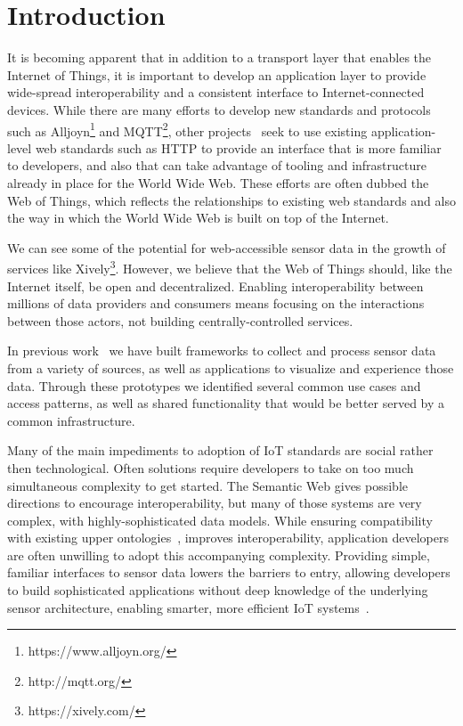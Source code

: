 \documentclass{acm_proc_article-sp}
\begin{document}
\section{Introduction}

It is becoming apparent that in addition to a transport layer that enables the
Internet of Things, it is important to develop an application layer to provide
wide-spread interoperability and a consistent interface to Internet-connected
devices. While there are many efforts to develop new standards and
protocols such as Alljoyn\footnote{https://www.alljoyn.org/} and
MQTT\footnote{http://mqtt.org/}, other projects~\cite{guinard2010} seek to
use existing application-level web standards such as HTTP to provide an
interface that is more familiar to developers, and also that can take advantage
of tooling and infrastructure already in place for the World Wide Web.
These efforts are often dubbed the Web of Things, which reflects the
relationships to existing web standards and also the way in which the World
Wide Web is built on top of the Internet.

We can see some of the potential for web-accessible sensor data in the growth
of services like Xively\footnote{https://xively.com/}. However, we believe that
the Web of Things should, like the Internet itself, be open and decentralized.
Enabling interoperability between millions of data providers and consumers
means focusing on the interactions between those actors, not building
centrally-controlled services.

In previous work~\cite{doppellab}\cite{gestures} we have built frameworks to collect
and process sensor data from a variety of sources, as well as applications to
visualize and experience those data. Through these prototypes we identified
several common use cases and access patterns, as well as shared functionality
that would be better served by a common infrastructure.

Many of the main impediments to adoption of IoT standards are social rather
then technological. Often solutions require developers to take on too much
simultaneous complexity to get started. The Semantic Web gives possible
directions to encourage interoperability, but many of those systems are very
complex, with highly-sophisticated data models. While ensuring compatibility
with existing upper
ontologies~\cite{w3contology}\cite{broring2011}\cite{eid2007}, improves
interoperability, application developers are often unwilling to adopt this
accompanying complexity. Providing simple, familiar interfaces to sensor data
lowers the barriers to entry, allowing developers to build sophisticated
applications without deep knowledge of the underlying sensor architecture,
enabling smarter, more efficient IoT systems~\cite{aldrich2013}.
\end{document}

